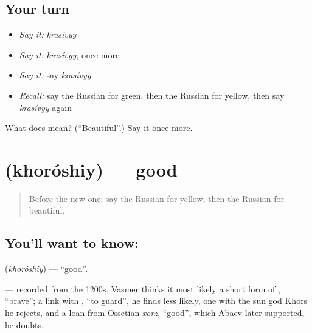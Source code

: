 \subsection*{Your turn}
\begin{itemize}
\raggedright
  \item \emph{Say it:} \emph{krasívyy}
  \item \emph{Say it:} \emph{krasívyy}, once more
  \item \emph{Say it:} say \emph{krasívyy}
  \item \emph{Recall:} say the Russian for green, then the Russian for yellow, then say \emph{krasívyy} again
\end{itemize}

\begin{tcolorbox}[breakable,colback=teal!4,colframe=teal!35!black,title={Before you move on}]
What does  mean? (\textquotedblleft{}Beautiful\textquotedblright{}.) Say it once more.
\end{tcolorbox}
\section[\texorpdfstring{\ru{хороший} (khoróshiy)}{хороший (khoróshiy)}]{ (khoróshiy) — good}

\label{lesson:RU-C64-good}



\begin{quote}
Before the new one: say the Russian for yellow, then the Russian for beautiful.
\end{quote}

\subsection*{You'll want to know: }
\textbf{} (\emph{khoróshiy}) — \textquotedblleft{}good\textquotedblright{}.

\begin{cousinweb}
\textbf{} — recorded from the 1200s. Vasmer thinks it most likely a short form of \emph{}, \textquotedblleft{}brave\textquotedblright{}; a link with \emph{}, \textquotedblleft{}to guard\textquotedblright{}, he finds less likely, one with the sun god Khors he rejects, and a loan from Ossetian \emph{xorz}, \textquotedblleft{}good\textquotedblright{}, which Abaev later supported, he doubts.
\end{cousinweb}

